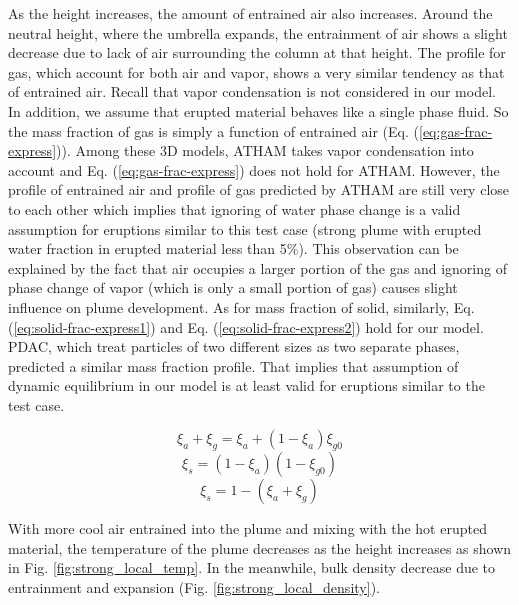 \documentclass[journal abbreviation, manuscript]{copernicus}
\begin{document}
As the height increases, the amount of entrained air also increases. Around the neutral height, where the umbrella expands, the entrainment of air shows a slight decrease due to lack of air surrounding the column at that height. The profile for gas, which account for both air and vapor, shows a very similar tendency as that of entrained air. Recall that vapor condensation is not considered in our model. In addition, we assume that erupted material behaves like a single phase fluid. So the mass fraction of gas is simply a function of entrained air (Eq. (\ref{eq:gas-frac-express})). Among these 3D models, ATHAM takes vapor condensation into account and Eq. (\ref{eq:gas-frac-express}) does not hold for ATHAM. However, the profile of entrained air and profile of gas predicted by ATHAM are still very close to each other which implies that ignoring of water phase change is a valid assumption for eruptions similar to this test case (strong plume with erupted water fraction in erupted material less than 5\%). This observation can be explained by the fact that air occupies a larger portion of the gas and ignoring of phase change of vapor (which is only a small portion of gas) causes slight influence on plume development. As for mass fraction of solid, similarly, Eq. (\ref{eq:solid-frac-express1}) and Eq. (\ref{eq:solid-frac-express2}) hold for our model. PDAC, which treat particles of two different sizes as two separate phases, predicted a similar mass fraction profile. That implies that assumption of dynamic equilibrium in our model is at least valid for eruptions similar to the test case.
 
\begin{equation}
\xi_a + \xi_g = \xi_a + \left(1-\xi_a\right) \xi_{g0}
\label{eq:gas-frac-express}
\end{equation}
\begin{equation}
\xi_s = \left(1 - \xi_a\right) \left(1- \xi_{g0}\right)
\label{eq:solid-frac-express1}
\end{equation}
\begin{equation}
\xi_s = 1 - \left(\xi_a + \xi_g\right)
\label{eq:solid-frac-express2}
\end{equation}

With more cool air entrained into the plume and mixing with the hot erupted material, the temperature of the plume decreases as the height increases as shown in Fig. \ref{fig:strong_local_temp}. In the meanwhile, bulk density decrease due to entrainment and expansion (Fig. \ref{fig:strong_local_density}).
\end{document}
